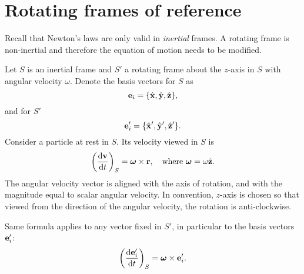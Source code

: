 \section{Rotating frames of reference}
Recall that Newton's laws are only valid in \textit{inertial} frames. A rotating frame is non-inertial and therefore the equation of motion needs to be modified.

Let $S$ is an inertial frame and $S'$ a rotating frame about the $z$-axis in $S$ with angular velocity $ \omega $. Denote the basis vectors for $S$ as 
\[
    {\bf e}_i = \{\hat{{\bf x}},\hat{{\bf y}},\hat{{\bf z}}\},
\]
and for $S'$ 
\[
    {\bf e}_i' = \{\hat{{\bf x}}',\hat{{\bf y}}',\hat{{\bf z}}'\}.
\]
Consider a particle at rest in $S$. Its velocity viewed in $S$ is 
\[
    \left( \frac{\mathrm{d}{\bf v}}{\mathrm{d}t}  \right)_S = \boldsymbol{\omega} \times \mathbf{r},\quad \text{where $ \boldsymbol{\omega}=\omega \hat{{\bf z}} $}.
\]
The angular velocity vector is aligned with the axis of rotation, and with the magnitude equal to scalar angular velocity. In convention, $z$-axis is chosen so that viewed from the direction of the angular velocity, the rotation is anti-clockwise.

Same formula applies to any vector fixed in $S'$, in particular to the basis vectors $ {\bf e}_i' $:
\[
    \left( \frac{\mathrm{d}{\bf e}_i'}{\mathrm{d}t}  \right)_S = \boldsymbol{\omega}\times {\bf e}_i'.
\]

